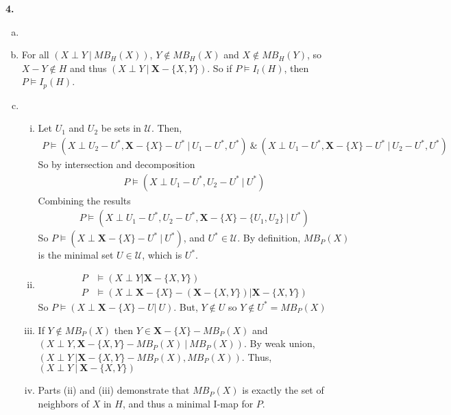 \documentclass{article}
\begin{document}
\textbf{4.} \begin{enumerate}[(a)]
    \item 
    \item For all $(X \perp Y\ |\ MB_H(X))$, $Y \notin MB_H(X)$ and $X \notin MB_H(Y)$, so $X - Y \notin H$ and thus $(X \perp Y\ |\ \mathbf{X} - \{X, Y \})$. So if $P \vDash I_{l}(H)$, then $P \vDash I_{p}(H)$.
    \item \begin{enumerate}[(i)]
        \item Let $U_1$ and $U_2$ be sets in $\mathcal{U}$. Then, \begin{align*}
            P \vDash (X \perp U_2 - U^*, \mathbf{X} - \{X\} - U^*\ |\ U_1 - U^*, U^*)\ \&  \ (X \perp U_1 - U^*, \mathbf{X} - \{X\} - U^*\ |\ U_2 - U^*, U^*)
        \end{align*}
        So by intersection and decomposition \begin{align*}
            P \vDash (X \perp U_1 - U^*, U_2 - U^* \ |\ U^*)
        \end{align*}
        Combining the results \begin{align*}
            P \vDash (X \perp U_1 - U^*, U_2 - U^*, \mathbf{X} - \{X\} - \{U_1, U_2\}\ |\ U^*)
        \end{align*}
        So $P \vDash (X \perp \mathbf{X} - \{X\} - U^*\ | \ U^*)$, and $U^* \in \mathcal{U}$. By definition, $MB_P(X)$ is the minimal set $U \in \mathcal{U}$, which is $U^*$. 
        \item \begin{align*}
            P &\vDash (X \perp Y | \mathbf{X} - \{X, Y\}) \\
            P &\vDash (X \perp \mathbf{X} - \{X\} - (\mathbf{X} - \{X, Y\}) | \mathbf{X} - \{X, Y\})
        \end{align*} 
        So $P \vDash (X \perp \mathbf{X} - \{X\} - U |\ U)$. But, $Y \notin U$ so $Y \notin U^* =  MB_P(X)$
        \item If $Y \notin MB_P(X)$ then $Y \in \mathbf{X} - \{X\} - MB_P(X)$ and $(X \perp Y, \mathbf{X} - \{X, Y\} - MB_P(X)\ |\ MB_P(X) )$. By weak union, $(X \perp Y\ |\mathbf{X} - \{X, Y\} - MB_P(X), MB_P(X))$. Thus, $(X \perp Y\ |\ \mathbf{X} - \{X, Y\})$
        \item Parts (ii) and (iii) demonstrate that $MB_P(X)$ is exactly the set of neighbors of $X$ in $H$, and thus a minimal I-map for $P$.
    \end{enumerate}
\end{enumerate}
\end{document}
